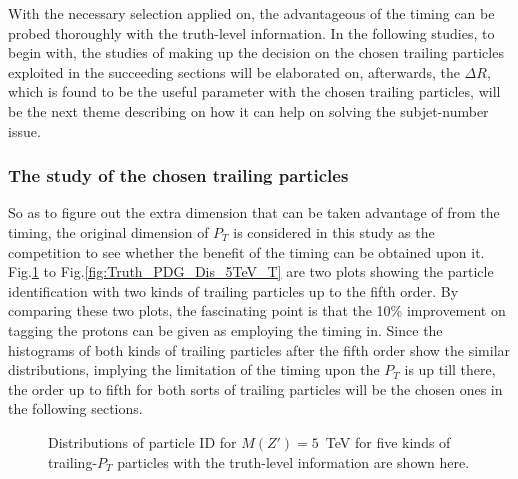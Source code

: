 With the necessary selection applied on, the advantageous of the timing can be probed thoroughly with the truth-level information. In the following studies, to begin with, the studies of making up the decision on the chosen trailing particles exploited in the succeeding sections will be elaborated on, afterwards, the $\Delta R$, which is found to be the useful parameter with the chosen trailing particles, will be the next theme describing on how it can help on solving the subjet-number issue. 

\subsubsection{The study of the chosen trailing particles}
So as to figure out the extra dimension that can be taken advantage of from the timing, the original dimension of $P_{T}$ is considered in this study as the competition to see whether the benefit of the timing can be obtained upon it.\\ 

Fig.\ref{fig:Truth_PDG_Dis_5TeV_PT} to Fig.\ref{fig:Truth_PDG_Dis_5TeV_T} are two plots showing the particle identification with two kinds of trailing particles up to the fifth order. By comparing these two plots, the fascinating point is that the 10\% improvement on tagging the protons can be given as employing the timing in. Since the histograms of both kinds of trailing particles after the fifth order show the similar distributions, implying the limitation of the timing upon the $P_{T}$ is up till there, the order up to fifth for both sorts of trailing particles will be the chosen ones in the following sections.

\begin{figure}
\begin{center}
\end{center}
\caption{Distributions of particle ID for $M(Z') = 5$~TeV for five kinds of trailing-$P_{T}$ particles with the truth-level information 
are shown here. \label{fig:Truth_PDG_Dis_5TeV_PT}}
\end{figure}


